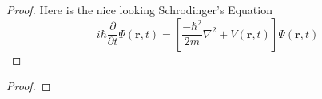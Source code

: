 \documentclass[name= Fname\ Lname, regnum= reg. num , course=Course, num= X]{assignment}
\begin{document}
\maketitle
{}
\lipsum*[1-2][1-4]

\begin{proof}
	\lipsum[1-2][1-3] 
	Here is the nice looking Schrodinger's Equation
	\[i\hbar\frac{\partial}{\partial t} \varPsi(\mathbf{r},t) = \left [ \frac{-\hbar^2}{2m}\nabla^2 + V(\mathbf{r},t)\right ] \varPsi(\mathbf{r},t)\]
\end{proof}

\separator

\lipsum*[1-2][1-4]

\begin{claim}
	\lipsum[1-2][1-2]
\end{claim}

\begin{proof}
	\lipsum[1-2][1-3] 
\end{proof}

\separator
\end{document}
